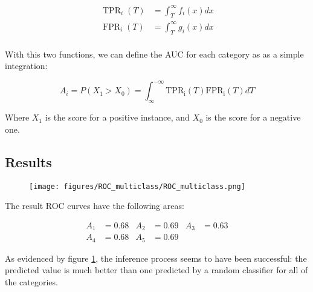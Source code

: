 \vspace{-1em}

\begin{align*}
\operatorname{TPR}_i(T) &= \int^{\infty}_T f_i(x) dx \\
\operatorname{FPR}_i(T) &= \int^{\infty}_T g_i(x) dx \\
\end{align*}

\vspace{-1.5em}

With this two functions, we can define the AUC for each category as as a simple integration:

\[
A_i = P(X_1 > X_0) = \int^{-\infty}_{\infty} \operatorname{TPR_i}(T) \operatorname{FPR_i}(T) dT
\]

Where $ X_1 $ is the score for a positive instance, and $ X_0 $ is the score for a negative one.

\subsection{Results}

\begin{figure}[H]
\begin{center}
\texttt{[image: figures/ROC\_multiclass/ROC\_multiclass.png]}
\caption{ \protect}
\label{ROC_multiclass}
\end{center}
\end{figure}

The result ROC curves have the following areas:

\vspace{-1em}

\begin{align*}
A_1 &= 0.68 & A_2 &= 0.69 & A_3 &= 0.63 \\ 
A_4 &= 0.68 & A_5 &= 0.69
\end{align*}

As evidenced by figure \ref{ROC_multiclass}, the inference process seems to have been successful: the predicted value is much better than one predicted by a random classifier for all of the categories.
